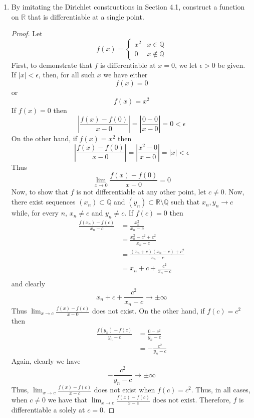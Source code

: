 \begin{enumerate}
    \item By imitating the Dirichlet constructions in Section 4.1, construct a function on \( \mathbb{R} \) that is differentiable at a single point.
    \begin{proof}
    Let
    \[
    f(x) = \begin{cases} x^{2} & x \in \mathbb{Q} \\ 0 & x \not\in \mathbb{Q} \end{cases}
    \]
    First, to demonstrate that \( f \) is differentiable at \( x= 0 \), we let \( \epsilon > 0 \) be given. If \( \vert x \vert < \epsilon \), then, for all such \( x \) we have either
    \[
    f(x) = 0
    \]
    or
    \[
    f(x) = x^{2}
    \]
    If \( f(x) = 0 \) then
    \[
    \left| \frac{f(x)-f(0)}{x-0} \right| = \left| \frac{0-0}{x-0} \right| = 0 < \epsilon
    \]
    On the other hand, if \( f(x) = x^{2} \) then
    \[
    \left| \frac{f(x)-f(0)}{x-0} \right| = \left| \frac{x^{2}-0}{x-0} \right| = \left| x \right| < \epsilon 
    \]
    Thus
    \[
    \lim_{x \rightarrow 0 } \frac{f(x) - f(0)}{x-0} = 0
    \]
    Now, to show that \( f \) is not differentiable at any other point, let \( c \neq 0 \). Now, there exist sequences \( (x_{n}) \subset \mathbb{Q} \) and \( (y_{n}) \subset \mathbb{R}\setminus\mathbb{Q} \) such that \( x_{n}, y_{n} \rightarrow c \) while, for every \( n \), \( x_{n} \neq c \) and \( y_{n} \neq c \). If \( f(c) = 0 \) then
    \begin{align*}
        \frac{f(x_{n})-f(c)}{x_{n}-c} &= \frac{x_{n}^{2}}{x_{n}-c} \\
        &= \frac{x_{n}^{2} -c^{2}+c^{2}}{x_{n}-c} \\
        &= \frac{(x_{n}+c)(x_{n}-c)+c^{2}}{x_{n}-c} \\
        &= x_{n}+c + \frac{c^{2}}{x_{n}-c} \\
    \end{align*}
    and clearly
    \[
    x_{n}+c + \frac{c^{2}}{x_{n}-c} \rightarrow \pm\infty
    \]
    Thus \( \lim_{x \rightarrow c} \frac{f(x) - f(c)}{x-0} \) does not exist. On the other hand, if \( f(c) = c^{2} \) then 
    \begin{align*}
        \frac{f(y_{n})-f(c)}{y_{n}-c} &= \frac{0-c^{2}}{y_{n}-c} \\
        &= - \frac{c^{2}}{y_{n}-c}
    \end{align*}
    Again, clearly we have
    \[
    -\frac{c^{2}}{y_{n}-c} \rightarrow \pm\infty
    \]
    Thus, \( \lim_{x \rightarrow c} \frac{f(x)-f(c)}{x-c} \) does not exist when \( f(c) = c^{2} \). Thus, in all cases, when \( c \neq 0 \) we have that \( \lim_{x \rightarrow c} \frac{f(x)-f(c)}{x-c} \) does not exist. Therefore, \( f \) is differentiable    a solely at \( c = 0 \). 
    \end{proof}
    

\end{enumerate}
